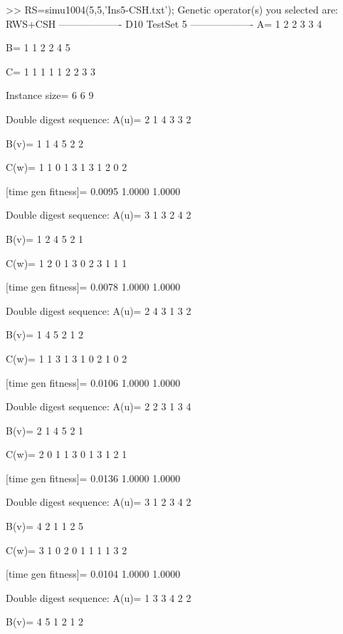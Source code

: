 >> RS=simu1004(5,5,'Ins5-CSH.txt');
Genetic operator(s) you selected are:
RWS+CSH
------------------- D10 TestSet 5 -------------------
A=
     1     2     2     3     3     4

B=
     1     1     2     2     4     5

C=
     1     1     1     1     1     2     2     3     3

Instance size=
     6     6     9

Double digest sequence:
A(u)=
     2     1     4     3     3     2

B(v)=
     1     1     4     5     2     2

C(w)=
     1     1     0     1     3     1     3     1     2     0     2

[time gen fitness]=
    0.0095    1.0000    1.0000

Double digest sequence:
A(u)=
     3     1     3     2     4     2

B(v)=
     1     2     4     5     2     1

C(w)=
     1     2     0     1     3     0     2     3     1     1     1

[time gen fitness]=
    0.0078    1.0000    1.0000

Double digest sequence:
A(u)=
     2     4     3     1     3     2

B(v)=
     1     4     5     2     1     2

C(w)=
     1     1     3     1     3     1     0     2     1     0     2

[time gen fitness]=
    0.0106    1.0000    1.0000

Double digest sequence:
A(u)=
     2     2     3     1     3     4

B(v)=
     2     1     4     5     2     1

C(w)=
     2     0     1     1     3     0     1     3     1     2     1

[time gen fitness]=
    0.0136    1.0000    1.0000

Double digest sequence:
A(u)=
     3     1     2     3     4     2

B(v)=
     4     2     1     1     2     5

C(w)=
     3     1     0     2     0     1     1     1     1     3     2

[time gen fitness]=
    0.0104    1.0000    1.0000

Double digest sequence:
A(u)=
     1     3     3     4     2     2

B(v)=
     4     5     1     2     1     2

